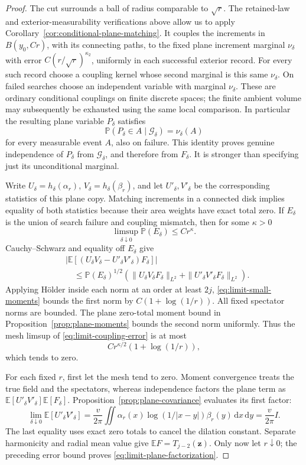 \documentclass[11pt]{article}
\newcommand{\E}{\mathbb E}
\newcommand{\Prob}{\mathbb P}
\newcommand{\dd}{\,\mathrm d}
\theoremstyle{definition}
\theoremstyle{remark}
\numberwithin{equation}{section}
\begin{document}
\begin{proof}
The cut surrounds a ball of radius comparable to \(\sqrt r\).
The retained-law and exterior-measurability verifications above allow
us to apply Corollary~\ref{cor:conditional-plane-matching}.  It couples
the increments
in \(B(y_0,Cr)\), with its connecting paths, to the fixed plane
increment marginal \(\nu_\delta\) with error
\(C(r/\sqrt r)^{\kappa_2}\), uniformly in each successful exterior
record.  For every such record choose a coupling kernel whose
second marginal is this same \(\nu_\delta\).  On failed searches
choose an independent variable with marginal \(\nu_\delta\).
These are ordinary conditional couplings on finite discrete
spaces; the finite ambient volume may subsequently be exhausted
using the same local comparison.  In particular the resulting
plane variable \(P_\delta\) satisfies
\[
     \Prob(P_\delta\in A\mid\mathcal G_\delta)=\nu_\delta(A)
\]
for every measurable event \(A\), also on failure.  This identity
proves genuine independence of \(P_\delta\) from
\(\mathcal G_\delta\), and therefore from \(F_\delta\).
It is stronger than specifying just its unconditional marginal.

Write \(U_\delta=h_\delta(\alpha_r)\),
\(V_\delta=h_\delta(\beta_r)\), and let \(U'_\delta,V'_\delta\)
be the corresponding statistics of this plane copy.
Matching increments in a connected disk implies equality of both
statistics because their area weights have exact total zero.
If \(E_\delta\) is the union of search failure and coupling mismatch,
then for some \(\kappa>0\)
\[
 \limsup_{\delta\downarrow0}\Prob(E_\delta)\le Cr^\kappa.
\]
Cauchy--Schwarz and equality off \(E_\delta\) give
\begin{align}
 &\left|\E[(U_\delta V_\delta-U'_\delta V'_\delta)F_\delta]\right|
 \nonumber\\
 &\quad\le
 \Prob(E_\delta)^{1/2}
 \left(\|U_\delta V_\delta F_\delta\|_{L^2}
               +\|U'_\delta V'_\delta F_\delta\|_{L^2}\right).
 \label{eq:limit-coupling-error}
\end{align}
Applying H\"older inside each norm at an order at least \(2j\),
\eqref{eq:limit-small-moments} bounds the first norm by
\(C(1+\log(1/r))\).  All fixed spectator norms are bounded.
The plane zero-total moment bound in
Proposition~\ref{prop:plane-moments} bounds the second norm uniformly.
Thus the mesh limsup of \eqref{eq:limit-coupling-error} is at most
\[
                  Cr^{\kappa/2}(1+\log(1/r)),
\]
which tends to zero.

For each fixed \(r\), first let the mesh tend to zero.
Moment convergence treats the true field and the spectators,
whereas independence factors the plane term as
\(\E[U'_\delta V'_\delta]\E[F_\delta]\).
Proposition~\ref{prop:plane-covariance} evaluates its first factor:
\[
 \lim_{\delta\downarrow0}\E[U'_\delta V'_\delta]
   =\frac{v}{2\pi}
       \iint\alpha_r(x)\log(1/|x-y|)\beta_r(y)\dd x\dd y
   =\frac{v}{2\pi}I.
\]
The last equality uses exact zero totals to cancel the dilation
constant.  Separate harmonicity and radial mean value give
\(\E F=T_{j-2}(\mathbf z)\).  Only now let \(r\downarrow0\);
the preceding error bound proves \eqref{eq:limit-plane-factorization}.


\end{proof}
\end{document}
